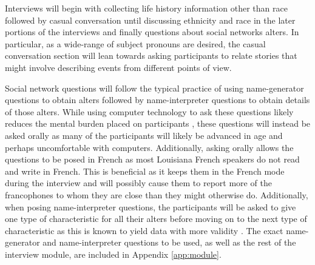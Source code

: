\documentclass{article}\usepackage[]{graphicx}\usepackage[]{xcolor}
\begin{document}
      Interviews will begin with collecting life history information other than race followed by casual conversation until discussing ethnicity and race in the later portions of the interviews and finally questions about social networks alters.
      In particular, as a wide-range of subject pronouns are desired, the casual conversation section will lean towards asking participants to relate stories that might involve describing events from different points of view.

      Social network questions will follow the typical practice of using name-generator questions to obtain alters followed by name-interpreter questions to obtain details of those alters.
      While using computer technology to ask these questions likely reduces the mental burden placed on participants \parencite[Stark \& Krosnick, 2017, as cited in][pp.~248-249]{vannette_collecting_2018}, these questions will instead be asked orally as many of the participants will likely be advanced in age and perhaps uncomfortable with computers.
      Additionally, asking orally allows the questions to be posed in French as most Louisiana French speakers do not read and write in French.
      This is beneficial as it keeps them in the French mode during the interview and will possibly cause them to report more of the francophones to whom they are close than they might otherwise do.
      Additionally, when posing name-interpreter questions, the participants will be asked to give one type of characteristic for all their alters before moving on to the next type of characteristic as this is known to yield data with more validity \parencite[Coromina \& Coenders, 2006; Vehovar et al., 2008, both as cited in][p.~247]{vannette_collecting_2018}.
      The exact name-generator and name-interpreter questions to be used, as well as the rest of the interview module, are included in Appendix \ref{app:module}.
\end{document}
